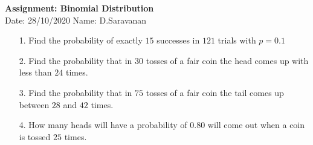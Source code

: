 \documentclass[a4paper,11pt,openright]{report}
\begin{document}
\singlespacing
\pagestyle{plain}

\begin{center}
\textbf{Assignment: Binomial Distribution} \\
Date: 28/10/2020 \hspace{2mm} Name: D.Saravanan
\end{center}

\vspace{10px}

\begin{enumerate}

\item[1.] Find the probability of exactly $15$ successes in $121$ trials with $p = 0.1$ \\

\item[2.] Find the probability that in $30$ tosses of a fair coin the head comes up with
less than $24$ times. \\

\item[3.] Find the probability that in $75$ tosses of a fair coin the tail comes up between
$28$ and $42$ times. \\

\item[4.] How many heads will have a probability of $0.80$ will come out when a coin is
tossed $25$ times. \\

\end{enumerate}
\end{document}
